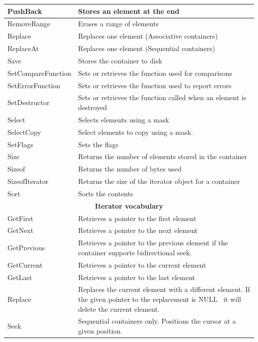 \documentclass[12pt,a4paper]{memoir} %
\newif\iftth
\newcommand{\Null}{{\iftth \ NULL \else \footnotesize NULL\  \fi}}
\begin{document}
{\begin{longtable}{|p{3.5cm}|p{10.5cm}|}
PushBack& Stores an element at the end \\\hline
RemoveRange&Erases a range of elements \\\hline
Replace & Replaces one element (Associative containers)\\\hline
ReplaceAt & Replaces one element (Sequential containers) \\\hline
Save&Stores the container to disk \\\hline
SetCompareFunction&Sets or retrieves the function used for comparisons \\\hline
SetErrorFunction&Sets or retrieves the function used to report errors\\\hline
SetDestructor&Sets or retrieves the function called when an element is destroyed \\\hline
Select&Selects elements using a mask \\\hline
SelectCopy&Select elements to copy using a mask.\\\hline
SetFlags&Sets the flags\\\hline
Size&Returns the number of elements stored in the container \\\hline
Sizeof&Returns the number of bytes used \\\hline
SizeofIterator&Returns the size of the iterator object for a container \\\hline
Sort&Sorts the contents \\\hline
 
\multicolumn{2}{|c|}{ \textbf{Iterator vocabulary}} \\\hline
GetFirst & Retrieves a pointer to the first element\\\hline
GetNext & Retrieves a pointer to the next element \\\hline
GetPrevious & Retrieves a pointer to the previous element if the container supports bidirectional seek.\\\hline
GetCurrent& Retrieves a pointer to the current element \\\hline
GetLast & Retrieves a pointer to the last element \\\hline
Replace & Replaces the current element with a different element. If the given pointer to the replacement is \Null 
it will delete the current element.\\\hline
Seek& Sequential containers only. Positions the cursor at a given position.\\\hline
\end{longtable}
} %
\end{document}

